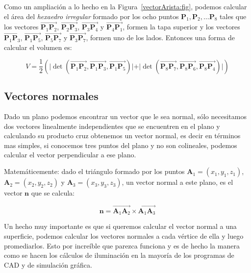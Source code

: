 Como un ampliación a lo hecho en la Figura~\ref{vectorArista:fig}, podemos calcular el área del \emph{hexaedro irregular} formado por los ocho puntos $\textbf{P}_1, \textbf{P}_2, \ldots \textbf{P}_8$ tales que los vectores $\overrightarrow{\textbf{P}_1 \textbf{P}_2}$, $\overrightarrow{\textbf{P}_2 \textbf{P}_3}$, $\overrightarrow{\textbf{P}_3 \textbf{P}_4}$ y $\overrightarrow{\textbf{P}_4 \textbf{P}_1}$, formen la tapa superior y los vectores $\overrightarrow{\textbf{P}_1 \textbf{P}_3}$, $\overrightarrow{\textbf{P}_1 \textbf{P}_5}$, $\overrightarrow{\textbf{P}_5 \textbf{P}_7}$ y $\overrightarrow{\textbf{P}_3 \textbf{P}_7}$, formen uno de los lados.
Entonces una forma de calcular el volumen es:

\begin{equation}
\label{ecuacionVolumen} 
 V =  \frac{1}{2} \left( \vert \det ( \overrightarrow{\textbf{P}_1 \textbf{P}_2}, \overrightarrow{\textbf{P}_1 \textbf{P}_3}, \overrightarrow{\textbf{P}_1 \textbf{P}_5} ) \vert + \vert \det (\overrightarrow{\textbf{P}_8 \textbf{P}_7}, \overrightarrow{\textbf{P}_8 \textbf{P}_6}, \overrightarrow{\textbf{P}_8 \textbf{P}_4} ) \vert \right) 
\end{equation}

\subsection{Vectores normales}
Dado un plano podemos encontrar un vector que le sea normal, sólo necesitamos dos vectores linealmente independientes que se encuentren en el plano y calculando su producto cruz obtenemos un vector normal, es decir en términos mas simples, si conocemos tres puntos del plano y no son colineales, podemos calcular el vector perpendicular a ese plano.

Matemáticemente: dado el triángulo formado por los puntos $\textbf{A}_1 = (x_1, y_1, z_1)$, $\textbf{A}_2 = (x_2, y_2, z_2)$ y $\textbf{A}_3 = (x_3, y_3, z_3)$, un vector normal a este plano, es el vector $\textbf{n}$ que se calcula:

$$ \textbf{n} = \overrightarrow{\textbf{A}_1 \textbf{A}_2} \times \overrightarrow{\textbf{A}_1 \textbf{A}_3}$$

Un hecho muy importante es que si queremos calcular el vector normal a una superficie, podemos calcular los vectores normales a cada vértice de ella y luego promediarlos.
Esto por increíble que parezca funciona y es de hecho la manera como se hacen los cálculos de iluminación en la mayoría de los programas de CAD y de simulación gráfica.

